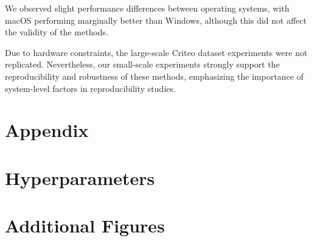\documentclass[a4paper,twocolumn]{article} %
\begin{document}
We observed slight performance differences between operating systems, with macOS performing marginally better than Windows, although this did not affect the validity of the methods.

Due to hardware constraints, the large-scale Criteo dataset experiments were not replicated. Nevertheless, our small-scale experiments strongly support the reproducibility and robustness of these methods, emphasizing the importance of system-level factors in reproducibility studies.




\clearpage
\appendix
\section*{Appendix}
\section{Hyperparameters}

\section{Additional Figures}
\end{document}

